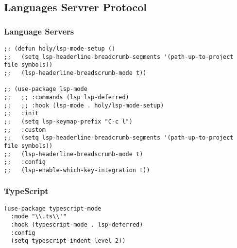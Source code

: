\documentclass[11pt]{article}
\begin{document}
\subsection*{Languages Servrer Protocol}
\label{sec:org816536c}
\subsubsection*{Language Servers}
\label{sec:org2c2b1e2}
\begin{verbatim}
;; (defun holy/lsp-mode-setup ()
;;   (setq lsp-headerline-breadcrumb-segments '(path-up-to-project file symbols))
;;   (lsp-headerline-breadscrumb-mode t))

;; (use-package lsp-mode
;;   ;; :commands (lsp lsp-deferred)
;;   ;; :hook (lsp-mode . holy/lsp-mode-setup)
;;   :init
;;   (setq lsp-keymap-prefix "C-c l")
;;   :custom
;;   (setq lsp-headerline-breadcrumb-segments '(path-up-to-project file symbols))
;;   (lsp-headerline-breadscrumb-mode t)
;;   :config
;;   (lsp-enable-which-key-integration t))
\end{verbatim}

\subsubsection*{TypeScript}
\label{sec:orgc602045}
\begin{verbatim}
(use-package typescript-mode
  :mode "\\.ts\\'"
  :hook (typescript-mode . lsp-deferred)
  :config
  (setq typescript-indent-level 2))

\end{verbatim}
\end{document}
